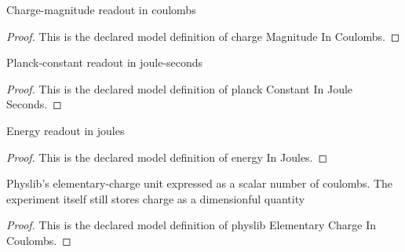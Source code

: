 \begin{definition}
  \label{def:physics:phyx-mini-0549:phyxminiproblems-problemphyxmini0549-chargemagnitudeincoulombs}
  Charge-magnitude readout in coulombs
\end{definition}
\begin{proof}
  This is the declared model definition of charge Magnitude In Coulombs.
\end{proof}
\begin{definition}
  \label{def:physics:phyx-mini-0549:phyxminiproblems-problemphyxmini0549-planckconstantinjouleseconds}
  Planck-constant readout in joule-seconds
\end{definition}
\begin{proof}
  This is the declared model definition of planck Constant In Joule Seconds.
\end{proof}
\begin{definition}
  \label{def:physics:phyx-mini-0549:phyxminiproblems-problemphyxmini0549-energyinjoules}
  Energy readout in joules
\end{definition}
\begin{proof}
  This is the declared model definition of energy In Joules.
\end{proof}
\begin{definition}
  \label{def:physics:phyx-mini-0549:phyxminiproblems-problemphyxmini0549-physlibelementarychargeincoulombs}
  Physlib's elementary-charge unit expressed as a scalar number of coulombs. The experiment itself still stores charge as a dimensionful quantity
\end{definition}
\begin{proof}
  This is the declared model definition of physlib Elementary Charge In Coulombs.
\end{proof}
